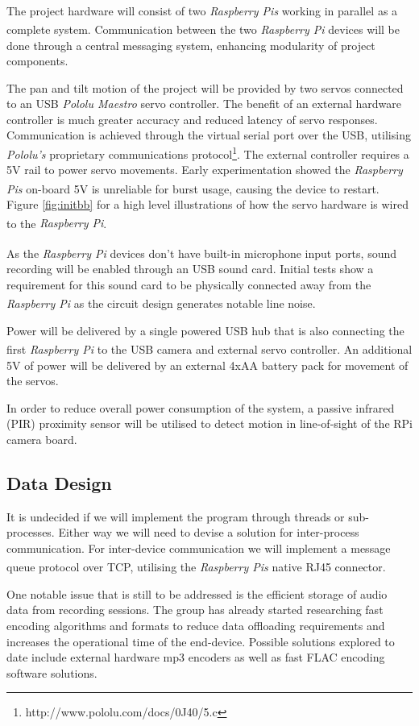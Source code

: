 \documentclass[11pt,a4paper,titlepage]{report}
\newcommand{\rpi}{\textit{Raspberry Pi\textsuperscript{\textregistered}}}
\newcommand{\rpis}{\textit{Raspberry Pi\textsuperscript{\textregistered}s}}
\begin{document}
The project hardware will consist of two \rpis\xspace working in parallel as a complete system. Communication between the two \rpi\xspace devices will be done through a central messaging system, enhancing modularity of project components.

The pan and tilt motion of the project will be provided by two servos connected to an USB \textit{Pololu Maestro} servo controller. The benefit of an external hardware controller is much greater accuracy and reduced latency of servo responses. Communication is achieved through the virtual serial port over the USB, utilising \textit{Pololu's} proprietary communications protocol\footnote{http://www.pololu.com/docs/0J40/5.c}. The external controller requires a 5V rail to power servo movements. Early experimentation showed the \rpis\xspace on-board 5V is unreliable for burst usage, causing the device to restart. Figure \ref{fig:initbb} for a high level illustrations of how the servo hardware is wired to the \rpi.


As the \rpi\xspace devices don't have built-in microphone input ports, sound recording will be enabled through an USB sound card. Initial tests show a requirement for this sound card to be physically connected away from the \rpi\xspace as the circuit design generates notable line noise.

Power will be delivered by a single powered USB hub that is also connecting the first \rpi\xspace to the USB camera and external servo controller. An additional 5V of power will be delivered by an external 4xAA battery pack for movement of the servos.

In order to reduce overall power consumption of the system, a passive infrared (PIR) proximity sensor will be utilised to detect motion in line-of-sight of the RPi camera board. 

\subsection{Data Design}

It is undecided if we will implement the program through threads or sub-processes. Either way we will need to devise a solution for inter-process communication. For inter-device communication we will implement a message queue protocol over TCP, utilising the \rpis\xspace native RJ45 connector.

One notable issue that is still to be addressed is the efficient storage of audio data from recording sessions. The group has already started researching fast encoding algorithms and formats to reduce data offloading requirements and increases the operational time of the end-device. Possible solutions explored to date include external hardware mp3 encoders as well as fast FLAC encoding software solutions.
\end{document}
